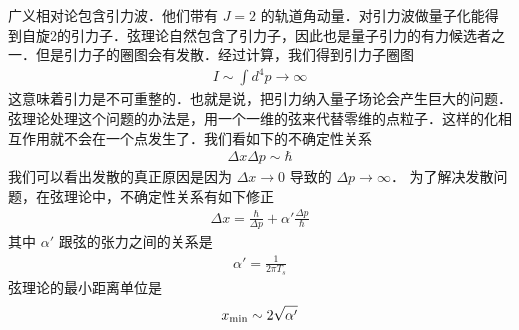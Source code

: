  
\begin{issues}
\issueNeedCite
\issueMissDepend
\end{issues}
 
 广义相对论包含引力波．他们带有 $J = 2$ 的轨道角动量．对引力波做量子化能得到自旋2的引力子．弦理论自然包含了引力子，因此也是量子引力的有力候选者之一．但是引力子的圈图会有发散．经过计算，我们得到引力子圈图
 \begin{align}
 I \sim \int d^4 p \rightarrow \infty 
 \end{align}
 这意味着引力是不可重整的．也就是说，把引力纳入量子场论会产生巨大的问题．弦理论处理这个问题的办法是，用一个一维的弦来代替零维的点粒子．这样的化相互作用就不会在一个点发生了．我们看如下的不确定性关系
 \begin{align}
\Delta x \Delta p \sim \hbar  
 \end{align}
我们可以看出发散的真正原因是因为 $\Delta x \rightarrow 0$ 导致的 $\Delta p \rightarrow  \infty  $．  为了解决发散问题，在弦理论中，不确定性关系有如下修正
\begin{align}
\Delta x  = \frac{\hbar}{\Delta p} + \alpha' \frac{\Delta p}{\hbar }
\end{align}
其中 $\alpha'$ 跟弦的张力之间的关系是
\begin{align}
\alpha ' = \frac{1}{2 \pi T_s} 
\end{align}
弦理论的最小距离单位是
\begin{align}
x_{\rm min} \sim 2 \sqrt{\alpha'}
\end{align}


